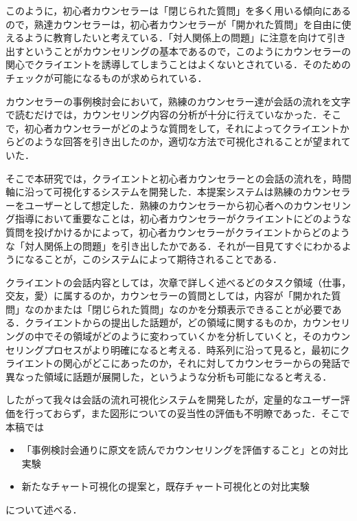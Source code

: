 \documentclass[shuuron]{kuee}
\begin{document}
このように，初心者カウンセラーは「閉じられた質問」を多く用いる傾向にあるので，熟達カウンセラーは，初心者カウンセラーが「開かれた質問」を自由に使えるように教育したいと考えている．「対人関係上の問題」に注意を向けて引き出すということがカウンセリングの基本であるので，このようにカウンセラーの関心でクライエントを誘導してしまうことはよくないとされている．そのためのチェックが可能になるものが求められている．

カウンセラーの事例検討会において，熟練のカウンセラー達が会話の流れを文字で読むだけでは，カウンセリング内容の分析が十分に行えていなかった．そこで，初心者カウンセラーがどのような質問をして，それによってクライエントからどのような回答を引き出したのか，適切な方法で可視化されることが望まれていた．

そこで本研究では，クライエントと初心者カウンセラーとの会話の流れを，時間軸に沿って可視化するシステムを開発した．本提案システムは熟練のカウンセラーをユーザーとして想定した．熟練のカウンセラーから初心者へのカウンセリング指導において重要なことは，初心者カウンセラーがクライエントにどのような質問を投げかけるかによって，初心者カウンセラーがクライエントからどのような「対人関係上の問題」を引き出したかである．それが一目見てすぐにわかるようになることが，このシステムによって期待されることである．%



クライエントの会話内容としては，次章で詳しく述べるどのタスク領域（仕事，交友，愛）に属するのか，カウンセラーの質問としては，内容が「開かれた質問」なのかまたは「閉じられた質問」なのかを分類表示できることが必要である．クライエントからの提出した話題が，どの領域に関するものか，カウンセリングの中でその領域がどのように変わっていくかを分析していくと，そのカウンセリングプロセスがより明確になると考える．時系列に沿って見ると，最初にクライエントの関心がどこにあったのか，それに対してカウンセラーからの発話で異なった領域に話題が展開した，というような分析も可能になると考える．

したがって我々\cite{uetsuji}は会話の流れ可視化システムを開発したが，定量的なユーザー評価を行っておらず，また図形についての妥当性の評価も不明瞭であった．そこで本稿では
\begin{itemize}
\item 「事例検討会通りに原文を読んでカウンセリングを評価すること」との対比実験
\item 新たなチャート可視化の提案と，既存チャート可視化との対比実験
\end{itemize}
について述べる．
\end{document}
